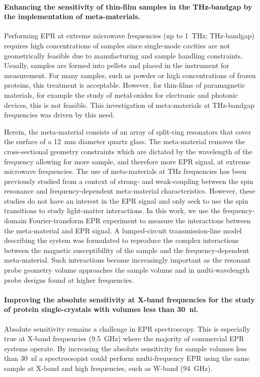 \hspace{1em}
\paragraph*{Enhancing the sensitivity of thin-film samples in the THz-bandgap by the implementation of meta-materials.}
Performing EPR at extreme microwave frequencies (up to 1~THz; THz-bandgap) requires high concentrations of samples since single-mode cavities are not geometrically feasible due to manufacturing and sample handling constraints. Usually, samples are formed into pellets and placed in the instrument for measurement. \cite{NEHRKORN201710} For many samples, such as powder or high concentrations of frozen proteins, this treatment is acceptable. However, for thin-films of paramagnetic materials, for example the study of metal-oxides for electronic and photonic devices, this is not feasible. \cite{oxidesurface} This investigation of meta-materials at THz-bandgap frequencies was driven by this need.

Herein, the meta-material consists of an array of split-ring resonators that cover the surface of a 12~mm diameter quartz glass. The meta-material removes the cross-sectional geometry constraints which are dictated by the wavelength of the frequency allowing for more sample, and therefore more EPR signal, at extreme microwave frequencies. The use of meta-materials at THz frequencies has been previously studied from a context of strong- and weak-coupling between the spin resonance and frequency-dependent meta-material characteristics.\cite{SchneiderEPR,BOERO2013133,Scalari1323} However, these studies do not have an interest in the EPR signal and only seek to use the spin transitions to study light-matter interactions. In this work, we use the frequency-domain Fourier-transform EPR experiment to measure the interactions between the meta-material and EPR signal. A lumped-circuit transmission-line model describing the system was formulated to reproduce the complex interactions between the magnetic susceptibility of the sample and the frequency-dependent meta-material. Such interactions become increasingly important as the resonant probe geometry volume approaches the sample volume and in multi-wavelength probe designs found at higher frequencies. \cite{grinbergVHF}

\hspace{1em}
\paragraph{Improving the absolute sensitivity at X-band frequencies for the study of protein single-crystals with volumes less than 30~nl.}
Absolute sensitivity remains a challenge in EPR spectroscopy. This is especially true at X-band frequencies (9.5~GHz) where the majority of commercial EPR systems operate. By increasing the absolute sensitivity for sample volumes less than 30~nl a spectrocsopist could perform multi-frequency EPR using the same sample at X-band and high frequencies, such as W-band (94~GHz). 

